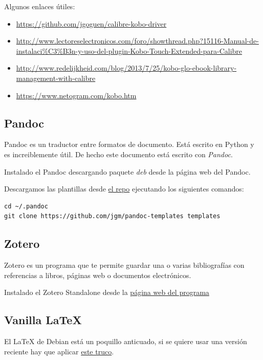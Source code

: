 \documentclass[12pt,spanish,]{scrartcl}
\providecommand{\tightlist}{%
  \setlength{\itemsep}{0pt}\setlength{\parskip}{0pt}}
\begin{document}
Algunos enlaces útiles:

\begin{itemize}
\tightlist
\item
  \url{https://github.com/jgoguen/calibre-kobo-driver}
\item
  \url{http://www.lectoreselectronicos.com/foro/showthread.php?15116-Manual-de-instalaci\%C3\%B3n-y-uso-del-plugin-Kobo-Touch-Extended-para-Calibre}
\item
  \url{http://www.redelijkheid.com/blog/2013/7/25/kobo-glo-ebook-library-management-with-calibre}
\item
  \url{https://www.netogram.com/kobo.htm}
\end{itemize}

\subsection{Pandoc}\label{pandoc}

Pandoc es un traductor entre formatos de documento. Está escrito en
Python y es increiblemente útil. De hecho este documento está escrito
con \emph{Pandoc}.

Instalado el Pandoc descargando paquete \emph{deb} desde la página web
del Pandoc.

Descargamos las plantillas desde
\href{https://github.com/jgm/pandoc-templates}{el repo} ejecutando los
siguientes comandos:

\begin{verbatim}
cd ~/.pandoc
git clone https://github.com/jgm/pandoc-templates templates
\end{verbatim}

\subsection{Zotero}\label{zotero}

Zotero es un programa que te permite guardar una o varias bibliografías
con referencias a libros, páginas web o documentos electrónicos.

Instalado el Zotero Standalone desde la
\href{https://www.zotero.org/}{página web del programa}

\subsection{Vanilla LaTeX}\label{vanilla-latex}

El LaTeX de Debian está un poquillo anticuado, si se quiere usar una
versión reciente hay que aplicar
\href{http://tex.stackexchange.com/questions/1092/how-to-install-vanilla-texlive-on-debian-or-ubuntu}{este
truco}.
\end{document}
